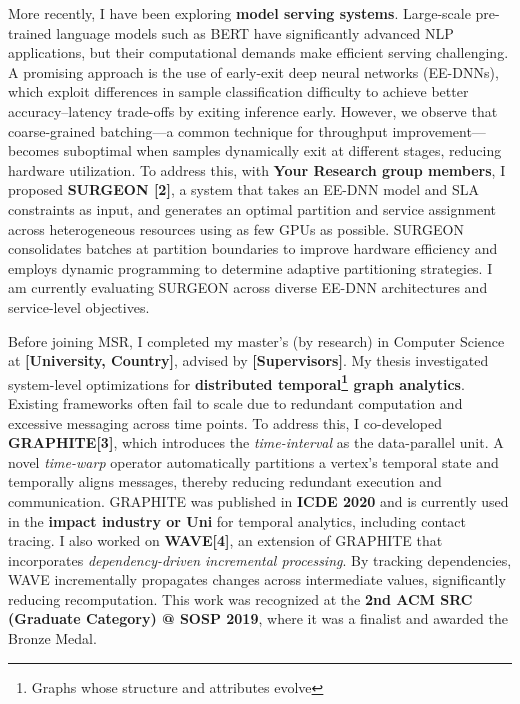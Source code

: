 \documentclass{article}
\newcommand{\graphite}{GRAPHITE\xspace}
\newcommand{\wave}{WAVE\xspace}
\begin{document}
More recently, I have been exploring \textbf{model serving systems}. Large-scale pre-trained language models such as BERT have significantly advanced NLP applications, but their computational demands make efficient serving challenging. A promising approach is the use of early-exit deep neural networks (EE-DNNs), which exploit differences in sample classification difficulty to achieve better accuracy--latency trade-offs by exiting inference early. However, we observe that coarse-grained batching---a common technique for throughput improvement---becomes suboptimal when samples dynamically exit at different stages, reducing hardware utilization. To address this, with \textbf{Your Research group members}, I proposed \textbf{SURGEON [2]}, a system that takes an EE-DNN model and SLA constraints as input, and generates an optimal partition and service assignment across heterogeneous resources using as few GPUs as possible. SURGEON consolidates batches at partition boundaries to improve hardware efficiency and employs dynamic programming to determine adaptive partitioning strategies. I am currently evaluating SURGEON across diverse EE-DNN architectures and service-level objectives.


Before joining MSR, I completed my master’s (by research) in Computer Science at \textbf{[University, Country]}, advised by \textbf{[Supervisors]}. My thesis investigated system-level optimizations for \textbf{distributed temporal\footnote{Graphs whose structure and attributes evolve} graph analytics}. Existing frameworks often fail to scale due to redundant computation and excessive messaging across time points. To address this, I co-developed \textbf{\graphite[3]}, which introduces the \emph{time-interval} as the data-parallel unit. A novel \emph{time-warp} operator automatically partitions a vertex’s temporal state and temporally aligns messages, thereby reducing redundant execution and communication. \graphite was published in \textbf{ICDE 2020} and is currently used in the \textbf{impact industry or Uni} for temporal analytics, including contact tracing.  I also worked on \textbf{\wave[4]}, an extension of \graphite that incorporates \emph{dependency-driven incremental processing}. By tracking dependencies, \wave incrementally propagates changes across intermediate values, significantly reducing recomputation. This work was recognized at the \textbf{2nd ACM SRC (Graduate Category) @ SOSP 2019}, where it was a finalist and awarded the Bronze Medal.
\end{document}
